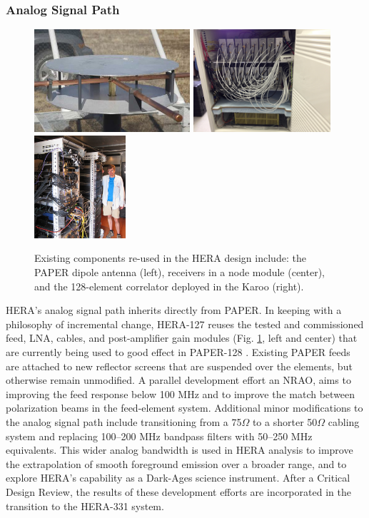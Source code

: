 \documentclass[preprint]{aastex}
\newcommand{\compress}{\vspace{-0.3in}}
\newcommand{\Caption}[4]{\vspace{#1}\renewcommand{\baselinestretch}{#2}\caption{#4}\vspace{#3}}
\begin{document}
\compress
\subsubsection{Analog Signal Path}
\vspace{-6pt}

\begin{figure}[t]
    \centering
        \includegraphics[height=1.5in]{plots/new_antenna_closeup.jpg}
        \includegraphics[height=1.5in]{plots/Engineering/recv_node.png}
        \includegraphics[height=1.5in]{plots/Engineering/digital.png}
    \Caption{-0.1in}{0.9}{-0.1in}{\small
    Existing components re-used in the HERA design include:
    the PAPER dipole antenna (left), 
    receivers in a node module (center), and
    the 128-element correlator deployed in the Karoo (right).
}\label{fig:components}
\end{figure}

HERA's analog signal path inherits directly from PAPER.
In keeping with a philosophy of
incremental change,
HERA-127 reuses the tested and commissioned feed, LNA, cables, and post-amplifier gain modules
(Fig. \ref{fig:components}, left and center) that are currently being
used to good effect in PAPER-128 \citep{parsons_et_al2010}.  Existing PAPER feeds are attached to new
reflector screens that are suspended over the elements, but otherwise remain unmodified.
A parallel development effort an NRAO, aims to improving the feed response below
100 MHz 
and to improve the match between polarization beams in the feed-element system.  
Additional
minor modifications to the analog signal path include transitioning from a 75$\Omega$ to a
shorter 50$\Omega$ cabling system and replacing 100--200 MHz bandpass filters with 50--250 MHz equivalents.
This wider analog bandwidth is used in HERA analysis to improve the extrapolation of smooth foreground
emission over a broader range, and to explore HERA's capability as a Dark-Ages science instrument.
After a Critical Design Review, the results of these development efforts are incorporated in
the transition to the HERA-331 system.  
\end{document}
